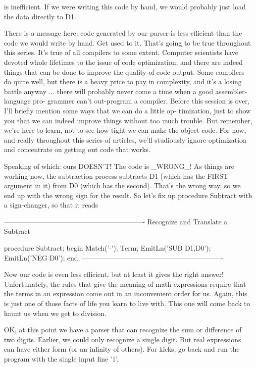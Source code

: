 \documentclass[float=false, crop=false]{standalone}
\begin{document}
is inefficient. If we were writing this code by hand, we would probably just
load the data directly to D1.

There is a message here: code generated by our parser is less efficient than the
code we would write by hand. Get used to it. That's going to be true throughout
this series. It's true of all compilers to some extent. Computer scientists have
devoted whole lifetimes to the issue of code optimization, and there are indeed
things that can be done to improve the quality of code output. Some compilers do
quite well, but there is a heavy price to pay in complexity, and it's a losing
battle anyway ... there will probably never come a time when a good
assembler-language pro- grammer can't out-program a compiler. Before this
session is over, I'll briefly mention some ways that we can do a little op-
timization, just to show you that we can indeed improve things without too much
trouble. But remember, we're here to learn, not to see how tight we can make the
object code. For now, and really throughout this series of articles, we'll
studiously ignore optimization and concentrate on getting out code that works.

Speaking of which: ours DOESN'T! The code is _WRONG_! As things are working now,
the subtraction process subtracts D1 (which has the FIRST argument in it) from
D0 (which has the second). That's the wrong way, so we end up with the wrong
sign for the result. So let's fix up procedure Subtract with a sign-changer, so
that it reads

\begin{code}
{-------------------------------------------------------------}
{ Recognize and Translate a Subtract }

procedure Subtract;
begin
   Match('-');
   Term;
   EmitLn('SUB D1,D0');
   EmitLn('NEG D0');
end;
{-------------------------------------------------------------}
\end{code}

Now our code is even less efficient, but at least it gives the right answer!
Unfortunately, the rules that give the meaning of math expressions require that
the terms in an expression come out in an inconvenient order for us. Again, this
is just one of those facts of life you learn to live with. This one will come
back to haunt us when we get to division.

OK, at this point we have a parser that can recognize the sum or difference of
two digits. Earlier, we could only recognize a single digit. But real
expressions can have either form (or an infinity of others). For kicks, go back
and run the program with the single input line '1'.
\end{document}
